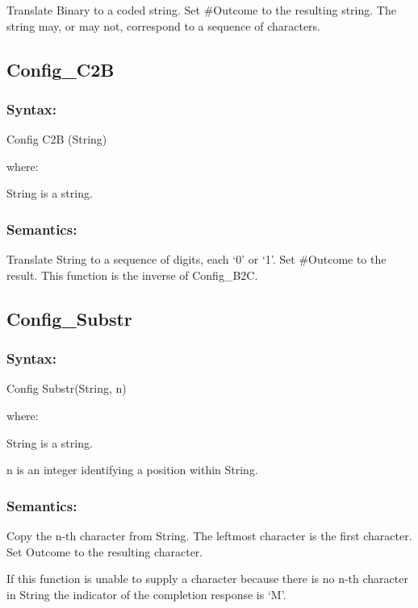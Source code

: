 Translate Binary to a coded string. Set \#Outcome to the resulting
string. The string may, or may not, correspond to a sequence of
characters.

\subsection{Config\_C2B}\label{config_c2b}

\subsubsection{Syntax:}\label{syntax-6}

Config C2B (String)

where:

String is a string.

\subsubsection{Semantics:}\label{semantics-7}

Translate String to a sequence of digits, each `0' or `1'. Set \#Outcome
to the result. This function is the inverse of Config\_B2C.

\subsection{Config\_Substr}\label{config_substr}

\subsubsection{Syntax:}\label{syntax-7}

Config Substr(String, n)

where:

String is a string.

n is an integer identifying a position within String.

\subsubsection{Semantics:}\label{semantics-8}

Copy the n-th character from String. The leftmost character is the first
character. Set Outcome to the resulting character.

If this function is unable to supply a character because there is no
n-th character in String the indicator of the completion response is
`M'.


